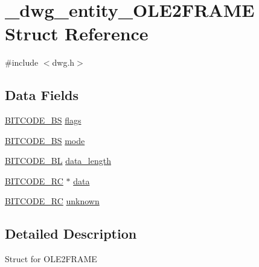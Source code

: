 \hypertarget{struct__dwg__entity__OLE2FRAME}{\section{\-\_\-dwg\-\_\-entity\-\_\-\-O\-L\-E2\-F\-R\-A\-M\-E \-Struct \-Reference}
\label{struct__dwg__entity__OLE2FRAME}
}


{\ttfamily \#include $<$dwg.\-h$>$}

\subsection*{\-Data \-Fields}
\begin{DoxyCompactItemize}
\item 
\hyperlink{dwg_8h_a94297606fbd4a4ff97e8add284af0809}{\-B\-I\-T\-C\-O\-D\-E\-\_\-\-B\-S} \hyperlink{struct__dwg__entity__OLE2FRAME_a43488b08b28dcb85bdd9f35a459ec105}{flags}
\item 
\hyperlink{dwg_8h_a94297606fbd4a4ff97e8add284af0809}{\-B\-I\-T\-C\-O\-D\-E\-\_\-\-B\-S} \hyperlink{struct__dwg__entity__OLE2FRAME_a7cd057c1c6a4367cd730fe44ff7ec5bb}{mode}
\item 
\hyperlink{dwg_8h_aebd5f127038868cbabc3d55d91da776c}{\-B\-I\-T\-C\-O\-D\-E\-\_\-\-B\-L} \hyperlink{struct__dwg__entity__OLE2FRAME_adc1d4700b2f79796e5da13fdc3f1a5a3}{data\-\_\-length}
\item 
\hyperlink{dwg_8h_a7fd199a8f9c9cc52bdab220f65a2a619}{\-B\-I\-T\-C\-O\-D\-E\-\_\-\-R\-C} $\ast$ \hyperlink{struct__dwg__entity__OLE2FRAME_a3681530a4ecb0bfaada2d73a59961d3d}{data}
\item 
\hyperlink{dwg_8h_a7fd199a8f9c9cc52bdab220f65a2a619}{\-B\-I\-T\-C\-O\-D\-E\-\_\-\-R\-C} \hyperlink{struct__dwg__entity__OLE2FRAME_a0d9cc51fa6c25ee8b27e5bb01ef080e2}{unknown}
\end{DoxyCompactItemize}


\subsection{\-Detailed \-Description}
\-Struct for \-O\-L\-E2\-F\-R\-A\-M\-E 

